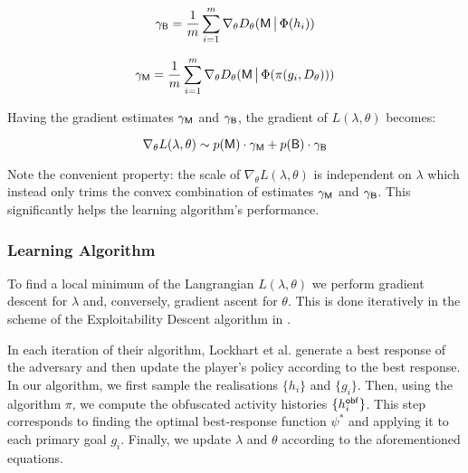 \begin{equation}
    \gamma_{\mathsf{B}} = \frac{1}{m} \sum^{m}_{i=1} \nabla_\theta D_\theta(\mathsf{M} \,\big|\, \Phi (h_i))
\end{equation}

\begin{equation}\label{eq:mal_estimate}
    \gamma_{\mathsf{M}} = \frac{1}{m} \sum^{m}_{i=1} \nabla_\theta D_\theta(\mathsf{M} \,\big|\, \Phi( \pi (g_i, D_\theta) ))
\end{equation}

Having the gradient estimates $\gamma_{\mathsf{M}}$ and $\gamma_{\mathsf{B}}$, the gradient of $L(\lambda, \theta)$ becomes:

\begin{equation}
    \nabla_\theta L(\lambda, \theta) \sim p(\mathsf{M}) \cdot \gamma_{\mathsf{M}} + p(\mathsf{B}) \cdot \gamma_{\mathsf{B}}
\end{equation}

Note the convenient property: the scale of $\nabla_\theta L(\lambda, \theta)$ is independent on $\lambda$ which instead only trims the convex combination of estimates $\gamma_{\mathsf{M}}$ and $\gamma_{\mathsf{B}}$. This significantly helps the learning algorithm's performance.

\subsubsection{Learning Algorithm}\label{sec:learning_algorithm}
To find a local minimum of the Langrangian $L(\lambda, \theta)$ we perform gradient descent for $\lambda$ and, conversely, gradient ascent for $\theta$. This is done iteratively in the scheme of the Exploitability Descent algorithm in \cite{exploitability_descent}.

In each iteration of their algorithm, Lockhart et al. \cite{exploitability_descent} generate a best response of the adversary and then update the player's policy according to the best response. In our algorithm, we first sample the realisations $\{ h_i \}$ and $\{ g_i \}$. Then, using the algorithm $\pi$, we compute the obfuscated activity histories $\{ h_i^{\mathsf{obf}} \}$. This step corresponds to finding the optimal best-response function $\psi^*$ and applying it to each primary goal $g_i$. Finally, we update $\lambda$ and $\theta$ according to the aforementioned equations.

